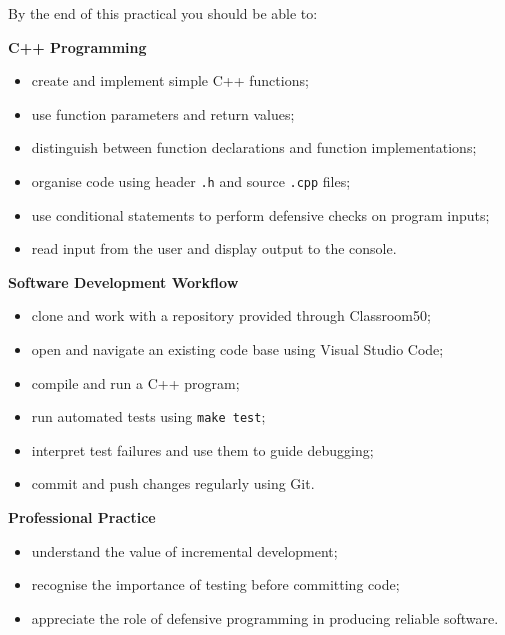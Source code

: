 \documentclass{csc2059practical}
\begin{document}
\begin{learningoutcomes}
By the end of this practical you should be able to:

\textbf{C++ Programming}
\begin{itemize}
  \item create and implement simple C++ functions;
  \item use function parameters and return values;
  \item distinguish between function declarations and function implementations;
  \item organise code using header \texttt{.h} and source \texttt{.cpp} files;
  \item use conditional statements to perform defensive checks on program inputs;
  \item read input from the user and display output to the console.
\end{itemize}

\textbf{Software Development Workflow}
\begin{itemize}
  \item clone and work with a repository provided through Classroom50;
  \item open and navigate an existing code base using Visual Studio Code;
  \item compile and run a C++ program;
  \item run automated tests using \texttt{make test};
  \item interpret test failures and use them to guide debugging;
  \item commit and push changes regularly using Git.
\end{itemize}

\textbf{Professional Practice}
\begin{itemize}
  \item understand the value of incremental development;
  \item recognise the importance of testing before committing code;
  \item appreciate the role of defensive programming in producing reliable software.
\end{itemize}
\end{learningoutcomes}
\end{document}
